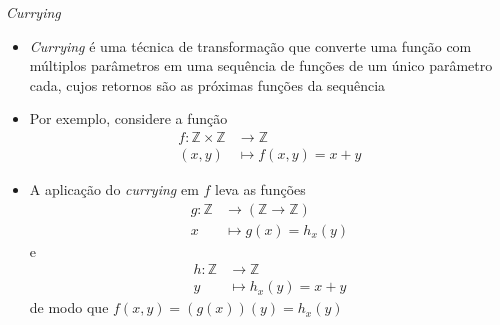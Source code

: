 \begin{frame}[fragile]{\it Currying}

    \begin{itemize}
        \item \textit{Currying} é uma técnica de transformação que converte uma função com
            múltiplos parâmetros em uma sequência de funções de um único parâmetro cada, cujos
            retornos são as próximas funções da sequência

        \item Por exemplo, considere a função 
        \begin{align*}
            f: \mathbb{Z} \times \mathbb{Z} & \to \mathbb{Z} \\
               (x, y) & \mapsto f(x, y) = x + y
        \end{align*}

        \item A aplicação do \textit{currying} em $f$ leva as funções
        \begin{align*}
            g: \mathbb{Z} & \to (\mathbb{Z} \to \mathbb{Z}) \\
               x & \mapsto g(x) = h_x(y)
        \end{align*}
        e
        \begin{align*}
            h: \mathbb{Z} & \to \mathbb{Z} \\
               y & \mapsto h_x(y) = x + y
        \end{align*}
        de modo que $f(x, y) = (g(x))(y) = h_x(y)$
    \end{itemize}

\end{frame}

